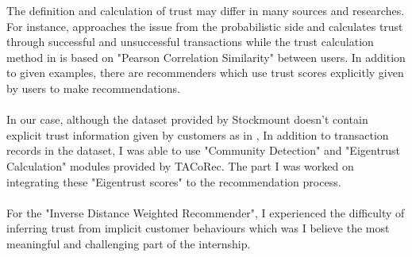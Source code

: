 The definition and calculation of trust may differ in many sources and researches. For instance, \cite{Eigentrust} approaches the issue from the probabilistic side and calculates trust through successful and unsuccessful transactions while the trust calculation method in \cite{papagelis_article} is based on "Pearson Correlation Similarity" between users. In addition to given examples, there are recommenders\cite{massa_article} which use trust scores explicitly given by users to make recommendations. \\ \\
In our case, although the dataset provided by Stockmount doesn't contain explicit trust information given by customers as in \cite{massa_article}, In addition to transaction records in the dataset, I was able to use "Community Detection" and "Eigentrust Calculation" modules provided by TACoRec. The part I was worked on integrating these "Eigentrust scores" to the recommendation process. \\ \\
For the "Inverse Distance Weighted Recommender", I experienced the difficulty of inferring trust from implicit customer behaviours which was I believe the most meaningful and challenging part of the internship.
